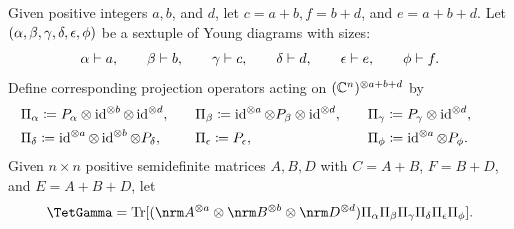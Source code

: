\documentclass[notitlepage, 10pt]{article}
\begin{document}
\begin{defn}
    \label{defn:tet_gamma}
    Given positive integers $a,b$, and $d$, let $c=a+b,f=b+d$, and $e=a+b+d$.
    Let $(\alpha, \beta, \gamma, \delta, \epsilon, \phi)$ be a sextuple of Young diagrams with sizes:
    \begin{equation}
        \label{eq:six_yd_sizes}
        \alpha \vdash a, \qquad
        \beta \vdash b, \qquad
        \gamma \vdash c, \qquad
        \delta \vdash d, \qquad
        \epsilon \vdash e, \qquad
        \phi \vdash f.
    \end{equation}
    Define corresponding projection operators acting on $(\mathbb C^{n})^{\otimes a+b+d}$ by
    \begin{equation}
        \label{eq:tet_extended_projs}
        \begin{alignedat}{3}
            &\Pi_{\alpha} \coloneqq P_{\alpha} \otimes \operatorname{id}^{\otimes b} \otimes \operatorname{id}^{\otimes d}, \qquad
            &&\Pi_{\beta} \coloneqq \operatorname{id}^{\otimes a} \otimes P_{\beta} \otimes \operatorname{id}^{\otimes d}, \qquad
            &&\Pi_{\gamma} \coloneqq P_{\gamma} \otimes \operatorname{id}^{\otimes d}, \qquad\\
             &\Pi_{\delta} \coloneqq \operatorname{id}^{\otimes a} \otimes \operatorname{id}^{\otimes b} \otimes P_{\delta}, \qquad
            &&\Pi_{\epsilon} \coloneqq P_{\epsilon}, \qquad
            &&\Pi_{\phi} \coloneqq \operatorname{id}^{\otimes a} \otimes P_{\phi}.
        \end{alignedat}
    \end{equation}
    Given $n\times n$ positive semidefinite matrices $A,B,D$ with $C=A+B$, $F=B+D$, and $E=A+B+D$, let
    \begin{equation}
        \TetGamma
        = \Tr[(\nrm A^{\ot a} \ot \nrm B^{\ot b} \ot \nrm D^{\ot d}) \Pi_{\ya}\Pi_{\yb}\Pi_{\yc}\Pi_{\yd}\Pi_{\ye}\Pi_{\yf}].
    \end{equation}
\end{defn}
\end{document}
